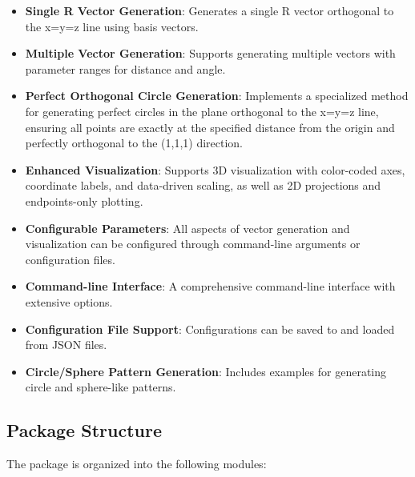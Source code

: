 \begin{itemize}
    \item \textbf{Single R Vector Generation}: Generates a single R vector orthogonal to the x=y=z line using basis vectors.
    
    \item \textbf{Multiple Vector Generation}: Supports generating multiple vectors with parameter ranges for distance and angle.
    
    \item \textbf{Perfect Orthogonal Circle Generation}: Implements a specialized method for generating perfect circles in the plane orthogonal to the x=y=z line, ensuring all points are exactly at the specified distance from the origin and perfectly orthogonal to the (1,1,1) direction.
    
    \item \textbf{Enhanced Visualization}: Supports 3D visualization with color-coded axes, coordinate labels, and data-driven scaling, as well as 2D projections and endpoints-only plotting.
    
    \item \textbf{Configurable Parameters}: All aspects of vector generation and visualization can be configured through command-line arguments or configuration files.
    
    \item \textbf{Command-line Interface}: A comprehensive command-line interface with extensive options.
    
    \item \textbf{Configuration File Support}: Configurations can be saved to and loaded from JSON files.
    
    \item \textbf{Circle/Sphere Pattern Generation}: Includes examples for generating circle and sphere-like patterns.
\end{itemize}

\subsection{Package Structure}

The package is organized into the following modules:


